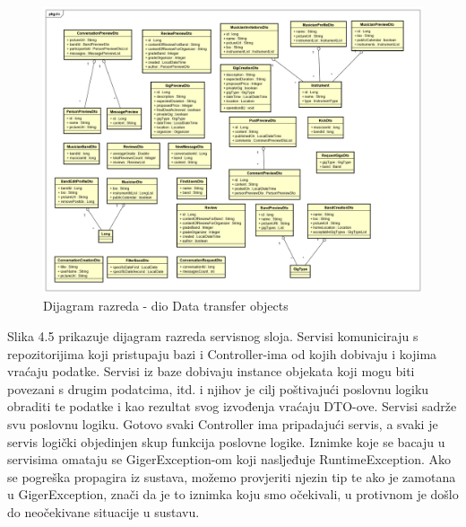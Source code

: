 			
			\begin{figure}[H]
				\begin{center}
					\includegraphics[width=17cm]{slike/DTO.PNG}
				\end{center}
				\caption{Dijagram razreda - dio Data transfer objects}
				\label{fig:dto}
			\end{figure}
		
		Slika 4.5 prikazuje dijagram razreda servisnog sloja. Servisi komuniciraju s repozitorijima koji pristupaju bazi i Controller-ima od kojih dobivaju i kojima vraćaju podatke. Servisi iz baze dobivaju instance objekata koji mogu biti povezani s drugim podatcima, itd. i njihov je cilj poštivajući poslovnu logiku obraditi te podatke i kao rezultat svog izvođenja vraćaju DTO-ove. Servisi sadrže svu poslovnu logiku. Gotovo svaki Controller ima pripadajući servis, a svaki je servis logički objedinjen skup funkcija poslovne logike. Iznimke koje se bacaju u servisima omataju se GigerException-om koji nasljeđuje RuntimeException. Ako se pogreška propagira iz sustava, možemo provjeriti njezin tip te ako je zamotana u GigerException, znači da je to iznimka koju smo očekivali, u protivnom je došlo do neočekivane situacije u sustavu.
		
